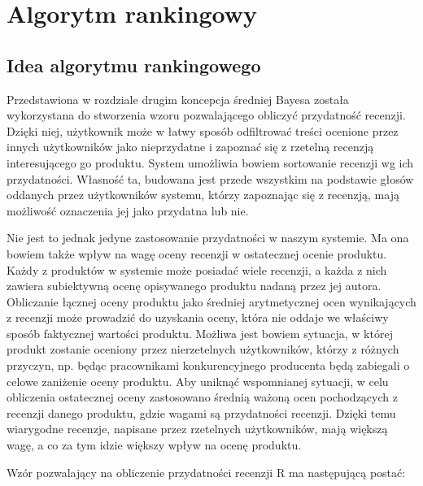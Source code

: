 \chapter{Algorytm rankingowy}

\section{Idea algorytmu rankingowego}

Przedstawiona w rozdziale drugim koncepcja średniej Bayesa została wykorzystana do stworzenia wzoru pozwalającego obliczyć przydatność recenzji. Dzięki niej, użytkownik może w łatwy sposób odfiltrować treści ocenione przez innych użytkowników jako nieprzydatne i zapoznać się z rzetelną recenzją interesującego go produktu. System umożliwia bowiem sortowanie recenzji wg ich przydatności. Własność ta, budowana jest przede wszystkim na podstawie głosów oddanych przez użytkowników systemu, którzy zapoznając się z recenzją, mają możliwość oznaczenia jej jako przydatna lub nie.

Nie jest to jednak jedyne zastosowanie przydatności w naszym systemie. Ma ona bowiem także wpływ na wagę oceny recenzji w ostatecznej ocenie produktu. Każdy z produktów w systemie może posiadać wiele recenzji, a każda z nich zawiera subiektywną ocenę opisywanego produktu nadaną przez jej autora. Obliczanie łącznej oceny produktu jako średniej arytmetycznej ocen wynikających z recenzji może prowadzić do uzyskania oceny, która nie oddaje we właściwy sposób faktycznej wartości produktu. Możliwa jest bowiem sytuacja, w której produkt zostanie oceniony przez nierzetelnych użytkowników, którzy z różnych przyczyn, np. będąc pracownikami konkurencyjnego producenta będą zabiegali o celowe zaniżenie oceny produktu. Aby uniknąć wspomnianej sytuacji, w celu obliczenia ostatecznej oceny zastosowano średnią ważoną ocen pochodzących z recenzji danego produktu, gdzie wagami są przydatności recenzji. Dzięki temu wiarygodne recenzje, napisane przez rzetelnych użytkowników, mają większą wagę, a co za tym idzie większy wpływ na ocenę produktu.

Wzór pozwalający na obliczenie przydatności recenzji R ma następującą postać:

